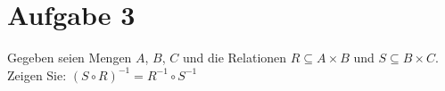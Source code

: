 \section*{Aufgabe 3}

Gegeben seien Mengen $A$, $B$, $C$ und die Relationen $R \subseteq A \times B$ und $S \subseteq B \times C$.\\
Zeigen Sie: $(S \circ R)^{-1} = R^{-1} \circ S^{-1}$
